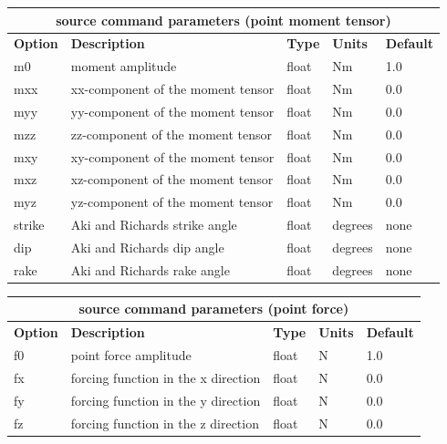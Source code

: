 \documentclass[11pt]{report}
\begin{document}
\begin{center}
\begin{tabular}{|l|p{8cm}|l|l|l|} \hline
\multicolumn{5}{|c|}{\bf source command parameters (point moment tensor)}\\ \hline
\bf{Option} & \bf{Description} & \bf{Type} & \bf{Units} & \bf{Default} \\ \hline \hline
m0 & moment amplitude & float & Nm & 1.0 \\ \hline
mxx & xx-component of the moment tensor & float & Nm & 0.0 \\ \hline
myy & yy-component of the moment tensor & float & Nm & 0.0 \\ \hline
mzz & zz-component of the moment tensor & float & Nm & 0.0 \\ \hline
mxy & xy-component of the moment tensor & float & Nm & 0.0 \\ \hline
mxz & xz-component of the moment tensor & float & Nm & 0.0 \\ \hline
myz & yz-component of the moment tensor & float & Nm & 0.0 \\ \hline
\hline
strike & Aki and Richards strike angle & float & degrees & none \\ \hline
dip & Aki and Richards dip angle & float & degrees & none \\ \hline
rake & Aki and Richards rake angle & float & degrees & none \\ \hline
\end{tabular}
\end{center}
\begin{center}
\begin{tabular}{|l|p{8cm}|l|l|l|} \hline
\multicolumn{5}{|c|}{\bf source command parameters (point force)}\\ \hline
\bf{Option} & \bf{Description} & \bf{Type} & \bf{Units} & \bf{Default} \\ \hline \hline
f0 & point force amplitude & float & N & 1.0 \\ \hline
fx & forcing function in the x direction & float & N & 0.0 \\ \hline
fy & forcing function in the y direction & float & N & 0.0 \\ \hline
fz & forcing function in the z direction & float & N & 0.0 \\ \hline
\end{tabular}
\end{center}
\end{document}
